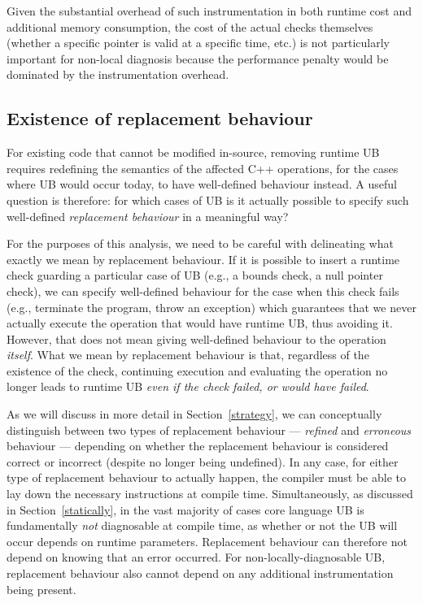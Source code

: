 {Given the substantial overhead of such instrumentation in both runtime cost and additional memory consumption, the cost of the actual checks themselves (whether a specific pointer is valid at a specific time, etc.) is not particularly important for non-local diagnosis because the performance penalty would be dominated by the instrumentation overhead.

\subsection{Existence of replacement behaviour}
\label{replacement}


For existing code that cannot be modified in-source, removing runtime UB requires redefining 
the semantics of the affected C++ operations, for the cases where UB would occur today, to have well-defined behaviour instead. A useful question is therefore: for which cases of UB is it actually possible to  specify such well-defined \emph{replacement behaviour} in a meaningful way?

For the purposes of this analysis, we need to be careful with delineating what exactly we mean by replacement behaviour. If it is possible to insert a runtime check guarding a particular case of UB (e.g., a bounds check, a null pointer check), we can specify well-defined behaviour for the case when this check fails (e.g., terminate the program, throw an exception) which guarantees that we never actually execute the operation that would have runtime UB, thus avoiding it. However, that does not mean giving well-defined behaviour to the operation \emph{itself}. What we mean by replacement behaviour is that, regardless of the existence of the check, continuing execution and evaluating the operation no longer leads to runtime UB \emph{even if the check failed, or would have failed}.

As we will discuss in more detail in Section~\ref{strategy}, we can conceptually distinguish between two types of replacement behaviour --- \emph{refined} and \emph{erroneous} behaviour --- depending on whether the replacement behaviour is considered correct or incorrect (despite no longer being undefined). In any case, for either type of replacement behaviour to actually happen, the compiler must be able to lay down the necessary instructions at compile time. Simultaneously, as discussed in Section~\ref{statically}, in the vast majority of cases core language UB is fundamentally \emph{not} diagnosable at compile time, as whether or not the UB will occur depends on runtime parameters. Replacement behaviour can therefore not depend on knowing that an error occurred. For non-locally-diagnosable UB, replacement behaviour also cannot depend on any additional instrumentation being present.

}
